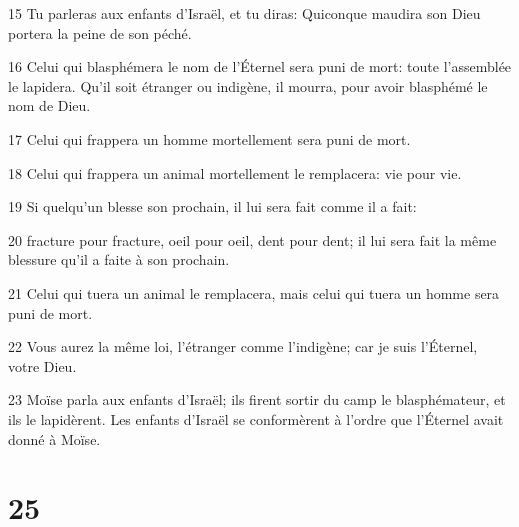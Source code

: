 \par 15 Tu parleras aux enfants d'Israël, et tu diras: Quiconque maudira son Dieu portera la peine de son péché.
\par 16 Celui qui blasphémera le nom de l'Éternel sera puni de mort: toute l'assemblée le lapidera. Qu'il soit étranger ou indigène, il mourra, pour avoir blasphémé le nom de Dieu.
\par 17 Celui qui frappera un homme mortellement sera puni de mort.
\par 18 Celui qui frappera un animal mortellement le remplacera: vie pour vie.
\par 19 Si quelqu'un blesse son prochain, il lui sera fait comme il a fait:
\par 20 fracture pour fracture, oeil pour oeil, dent pour dent; il lui sera fait la même blessure qu'il a faite à son prochain.
\par 21 Celui qui tuera un animal le remplacera, mais celui qui tuera un homme sera puni de mort.
\par 22 Vous aurez la même loi, l'étranger comme l'indigène; car je suis l'Éternel, votre Dieu.
\par 23 Moïse parla aux enfants d'Israël; ils firent sortir du camp le blasphémateur, et ils le lapidèrent. Les enfants d'Israël se conformèrent à l'ordre que l'Éternel avait donné à Moïse.

\chapter{25}

